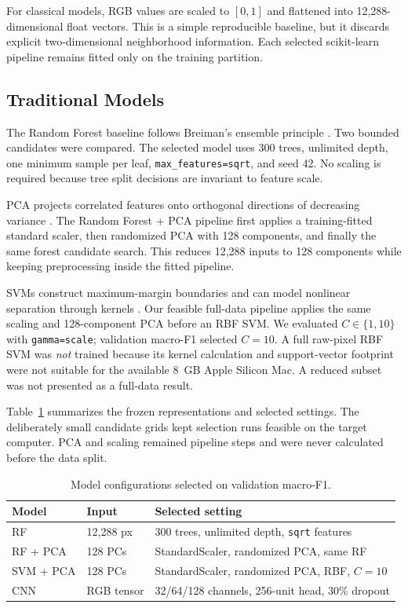 \documentclass[conference]{IEEEtran}
\begin{document}
For classical models, RGB values are scaled to $[0,1]$ and flattened into
12,288-dimensional float vectors. This is a simple reproducible baseline, but
it discards explicit two-dimensional neighborhood information. Each selected
scikit-learn pipeline remains fitted only on the training partition.

\subsection{Traditional Models}

The Random Forest baseline follows Breiman's ensemble principle
\cite{breiman2001}. Two bounded candidates were compared. The selected model
uses 300 trees, unlimited depth, one minimum sample per leaf,
\texttt{max\_features=sqrt}, and seed 42. No scaling is required because tree
split decisions are invariant to feature scale.

PCA projects correlated features onto orthogonal directions of decreasing
variance \cite{pearson1901}. The Random Forest + PCA pipeline first applies a
training-fitted standard scaler, then randomized PCA with 128 components, and
finally the same forest candidate search. This reduces 12,288 inputs to 128
components while keeping preprocessing inside the fitted pipeline.

SVMs construct maximum-margin boundaries and can model nonlinear separation
through kernels \cite{cortes1995}. Our feasible full-data pipeline applies the
same scaling and 128-component PCA before an RBF SVM. We evaluated
$C\in\{1,10\}$ with \texttt{gamma=scale}; validation macro-F1 selected
$C=10$. A full raw-pixel RBF SVM was \emph{not} trained because its kernel
calculation and support-vector footprint were not suitable for the available
8~GB Apple Silicon Mac. A reduced subset was not presented as a full-data
result.

Table~\ref{tab:configurations} summarizes the frozen representations and
selected settings. The deliberately small candidate grids kept selection runs
feasible on the target computer. PCA and scaling remained pipeline steps and
were never calculated before the data split.

\begin{table}[t]
\centering
\caption{Model configurations selected on validation macro-F1.}
\label{tab:configurations}
\footnotesize
\setlength{\tabcolsep}{3.5pt}
\begin{tabular}{lp{1.05cm}p{3.55cm}}
\toprule
Model & Input & Selected setting \\
\midrule
RF & 12,288 px & 300 trees, unlimited depth, \texttt{sqrt} features \\
RF + PCA & 128 PCs & StandardScaler, randomized PCA, same RF \\
SVM + PCA & 128 PCs & StandardScaler, randomized PCA, RBF, $C=10$ \\
CNN & RGB tensor & 32/64/128 channels, 256-unit head, 30\% dropout \\
\bottomrule
\end{tabular}
\end{table}
\end{document}
